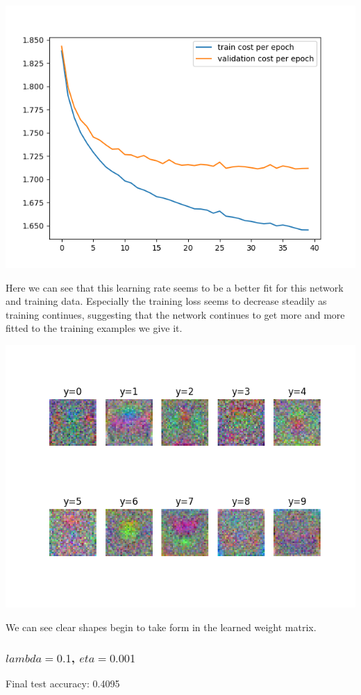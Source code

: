 \documentclass[11pt,a4paper]{article}
\begin{document}
\includegraphics[width=\textwidth]{eta_0.001_lambda_0.png}

Here we can see that this learning rate seems to be a better fit for this network and training data. Especially the training loss seems to decrease steadily as training continues, suggesting that the network continues to get more and more fitted to the training examples we give it.

\includegraphics[width=\textwidth]{eta_0.001_lambda_0_montage.png}

We can see clear shapes begin to take form in the learned weight matrix.

\subsubsection{$lambda=0.1$, $eta=0.001$}
Final test accuracy: 0.4095
\end{document}
